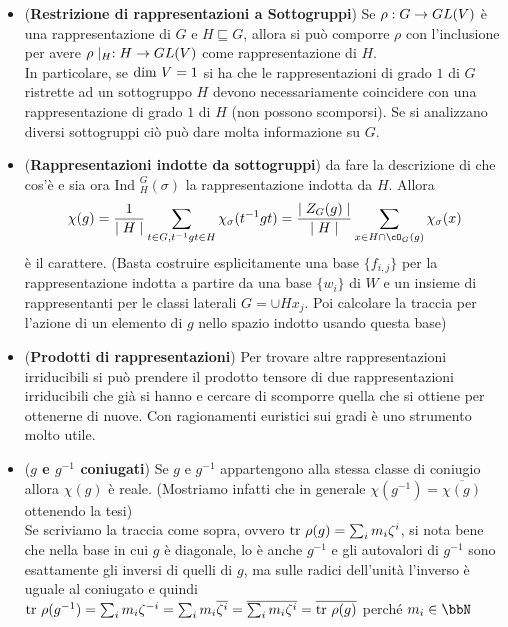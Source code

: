 \documentclass[a4paper,NoNotes,GeneralMath]{stdmdoc}
\newcommand{\sgr}{\sqsubseteq}
\newcommand{\Ind}{\text{Ind }}
\begin{document}
\begin{itemize}
		\item ({\bf Restrizione di rappresentazioni a Sottogruppi}) Se $\rho: G \rightarrow GL(V)$ è una rappresentazione di $G$ e $H \sgr G$, allora si può comporre $\rho$ con l'inclusione per avere $\rho\mid_H: H \rightarrow GL(V)$ come rappresentazione di $H$. \\
		In particolare, se $\mbox{dim } V = 1$ si ha che le rappresentazioni di grado $1$ di $G$ ristrette ad un sottogruppo $H$ devono necessariamente coincidere con una rappresentazione di grado $1$ di $H$ (non possono scomporsi). Se si analizzano diversi sottogruppi ciò può dare molta informazione su $G$.

		\item ({\bf Rappresentazioni indotte da sottogruppi}) {\color{blue} da fare la descrizione di che cos'è} e sia ora $\Ind_H^{G}(\sigma)$ la rappresentazione indotta da $H$. Allora $$\chi(g) = \frac{1}{\mid H \mid} \sum_{t \in G, t^{-1}gt \in H} \chi_\sigma(t^{-1}gt) = \frac{\mid Z_G(g) \mid}{\mid H \mid} \sum_{x \in H \cap \cO_G(g)} \chi_\sigma(x) $$ è il carattere. (Basta costruire esplicitamente una base $\{f_{i,j}\}$ per la rappresentazione indotta a partire da una base $\{w_i\}$ di $W$ e un insieme di rappresentanti per le classi laterali $G = \cup Hx_j$. Poi calcolare la traccia per l'azione di un elemento di $g$ nello spazio indotto usando questa base)

		\item ({\bf Prodotti di rappresentazioni}) Per trovare altre rappresentazioni irriducibili si può prendere il prodotto tensore di due rappresentazioni irriducibili che già si hanno e cercare di scomporre quella che si ottiene per ottenerne di nuove. Con ragionamenti euristici sui gradi è uno strumento molto utile.

		\item ({\bf $g$ e $g^{-1}$ coniugati}) Se $g$ e $g^{-1}$ appartengono alla stessa classe di coniugio allora $\chi(g)$ è reale. (Mostriamo infatti che in generale $\chi(g^{-1}) = \overline{\chi(g)}$ ottenendo la tesi) \\
		Se scriviamo la traccia come sopra, ovvero $\mbox{tr } \rho(g) = \sum_i m_i \zeta^i$, si nota bene che nella base in cui $g$ è diagonale, lo è anche $g^{-1}$ e gli autovalori di $g^{-1}$ sono esattamente gli inversi di quelli di $g$, ma sulle radici dell'unità l'inverso è uguale al coniugato e quindi $\mbox{tr } \rho(g^{-1}) = \sum_i m_i \zeta^{-i} = \sum_i m_i \overline{\zeta^{i}} = \overline{ \sum_i m_i \zeta^{i}} = \overline{\mbox{tr } \rho(g)}$ perché $m_i \in \bbN$


\end{itemize}
\end{document}
